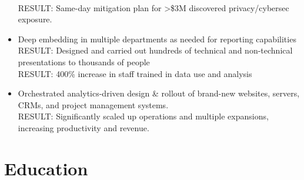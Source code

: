 \documentclass[]{deedy-resume-openfont}
\begin{document}
\begin{itemize}
        \\ RESULT: Same-day mitigation plan for >\$3M discovered privacy/cybersec exposure.
        \item Deep embedding in multiple departments as needed for reporting capabilities
        \\ RESULT: Designed and carried out hundreds of technical and non-technical presentations to thousands of people
        \\ RESULT: 400\% increase in staff trained in data use and analysis
        \item Orchestrated analytics-driven design \& rollout of brand-new websites, servers, CRMs, and project management systems.
        \\ RESULT: Significantly scaled up operations and multiple expansions, increasing productivity and revenue.
    \end{itemize}

\iffalse

\section{Education}
    \sectionsep
    \sectionsep
\end{document}
